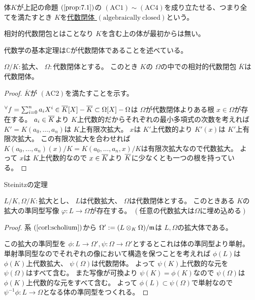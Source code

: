 \documentclass[../master_galois_theory]{subfiles}
\begin{document}
\begin{defi}
  体$K$が上記の命題 $(\mathrm{\ref{prop:7.1}})$の $(\mathrm{AC}1) \sim (\mathrm{AC}4)$を成り立たせる、つまり全てを満たすとき
  $K$を\underline{代数閉体 $(\mathrm{algebraically \  closed})$}という。

  相対的代数閉包とはことなり $K$を含む上の体が最初からは無い。
\end{defi}

\begin{exam}
  代数学の基本定理は$\mathbb{C}$が代数閉体であることを述べている。
\end{exam}

\begin{prop}
  $\Omega/K:$拡大、 $\Omega :$代数閉体とする。
  このとき $K$の $\Omega$の中での相対的代数閉包 $\overline{K}$は代数閉体。
\end{prop}

\begin{proof}
  $\overline{K}$が $(\mathrm{AC}2)$を満たすことを示す。

  ${}^\forall f = \sum_{i=0}^n a_i X^i \in \overline{K}[X] - \overline{K} \subset \Omega[X] - \Omega$は
  $\Omega$が代数閉体よりある根 $x \in \Omega$が存在する。
  $a_i \in \overline{K}$より $K$上代数的だからそれぞれの最小多項式の次数を考えれば
  $K' = K(a_0 , \dots , a_n)$は $K$上有限次拡大。
  $x$は $K'$上代数的より
  $K'(x)$は $K'$上有限次拡大。
  この有限次拡大を合わせれば $K(a_0 , \dots , a_n)(x)/K = K(a_0 , \dots , a_n , x)/K$は有限次拡大なので代数拡大。
  よって $x$は $K$上代数的なので $x \in \overline{K}$より $\overline{K}$に少なくとも一つの根を持っている。
\end{proof}

\begin{theo} \label{theo:7.3}
  \rm{Steinitz}の定理

  $L/K , \Omega/K:$拡大とし、 $L$は代数拡大、 $\Omega$は代数閉体とする。
  このときある $K$の拡大の準同型写像 $\varphi : L \longrightarrow \Omega$が存在する。
  $(任意の代数拡大は \Omega に埋め込める)$
\end{theo}

\begin{proof}
  系 $(\mathrm{\ref{corl:scholium}})$から $\Omega' := (L \otimes_K \Omega)/\mathfrak{m}$は $L , \Omega$の拡大体である。

  この拡大の準同型を $\phi : L \longrightarrow \Omega' , \psi : \Omega \longrightarrow \Omega'$とするとこれは体の準同型より単射。
  単射準同型なのでそれぞれの像において構造を保つことを考えれば
  $\phi(L)$は $\phi(K)$上代数拡大、 $\psi(\Omega)$は代数閉体。
  よって $\psi(K)$上代数的な元を $\psi(\Omega)$はすべて含む。
  また写像が可換より $\psi(K) = \phi(K)$なので
  $\psi(\Omega)$は $\phi(K)$上代数的な元をすべて含む。
  よって $\phi(L) \subset \psi(\Omega)$で単射なので
  $\psi^{-1}\phi : L \longrightarrow \Omega$となる体の準同型をつくれる。
\end{proof}
\end{document}
